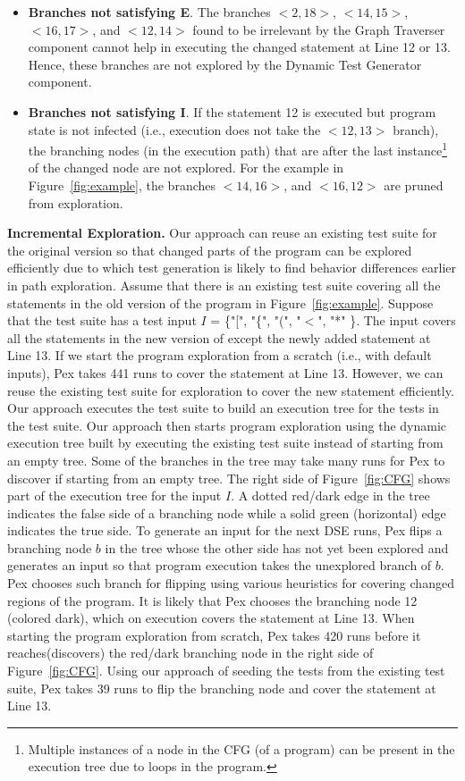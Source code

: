 \begin{itemize}
	\item \textbf{Branches not satisfying E}. The branches $<2, 18>$, $<14, 15>$, $<16, 17>$, and $<12, 14>$ found to be irrelevant by the Graph Traverser component cannot help in executing the changed statement at Line 12 or 13. Hence, these branches are not explored by the Dynamic Test Generator component. 
	\item \textbf{Branches not satisfying I}. If the statement 12 is executed but program state is not infected (i.e., execution does not take the  $<12, 13>$ branch), the branching nodes (in the execution path)
that are after the last instance\footnote{Multiple instances of a node in the CFG (of a program) can be present in the execution tree due to loops in the program.} of the changed node are not explored. For the example in Figure~\ref{fig:example}, the branches $<14, 16>$, and $<16, 12>$ are pruned from exploration.
\end{itemize}
\textbf{Incremental Exploration.} Our approach can reuse an existing
test suite for the original version so that changed parts of the program can be explored
efficiently due to which test generation is likely to find behavior
differences earlier in path exploration. Assume that there is an existing test suite covering all the statements in the old version of the program in Figure~\ref{fig:example}. Suppose that the test suite has a test input $I$ = \{"[", "\{", "(", "$<$", "*" \}. The input covers all the statements in the new version of  except the newly added statement at Line 13. If we start the program exploration from a scratch (i.e., with default inputs), Pex takes 441 runs to cover the statement at Line 13. However, we can reuse the existing test suite for exploration to cover the new statement efficiently. Our approach executes the test suite to build an execution tree for the tests in the test suite. Our approach then starts program exploration using the dynamic execution tree built by executing the existing test suite instead of starting from an empty tree. Some of the branches in the tree may take many runs for Pex to discover if starting from an empty tree. The right side of Figure~\ref{fig:CFG} shows part of the execution tree for the input $I$. A dotted red/dark edge in the tree indicates the false side of a branching node while a solid green (horizontal) edge indicates the true side. To generate an input for the next DSE runs, Pex flips a branching node $b$ in the tree whose the other side has not yet been explored and generates an input so that program execution takes the unexplored branch of $b$. Pex chooses such branch for flipping using various heuristics for covering changed regions of the program. It is likely that Pex chooses the branching node 12 (colored dark), which on execution covers the statement at Line 13. When starting the program exploration from scratch, Pex takes 420 runs before it reaches(discovers) the red/dark branching node in the right side of Figure~\ref{fig:CFG}. Using our approach of seeding the tests from the existing test suite, Pex takes 39 runs to flip the branching node and cover the statement at Line 13.





